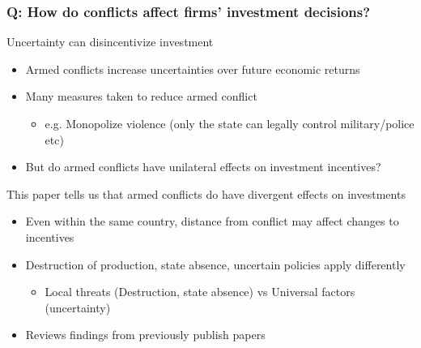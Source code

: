 \documentclass[aspectratio=169]{beamer}
\begin{document}
\begin{frame}
\frametitle{Q: How do conflicts affect firms' investment decisions?} 
Uncertainty can disincentivize investment
\begin{itemize}\setlength\itemsep{3pt}
\item Armed conflicts increase uncertainties over future economic returns
\item Many measures taken to reduce armed conflict
\begin{itemize}
\item e.g. Monopolize violence (only the state can legally control military/police etc)
\end{itemize}
\item But do armed conflicts have unilateral effects on investment incentives? 
\end{itemize}\medskip
This paper tells us that armed conflicts do have divergent effects on investments
\begin{itemize}\setlength\itemsep{3pt}
\item Even within the same country, distance from conflict may affect changes to incentives
\item Destruction of production, state absence, uncertain policies apply differently
\begin{itemize}
  \item Local threats (Destruction, state absence) vs Universal factors (uncertainty) 
\end{itemize}
\item Reviews findings from previously publish papers 
\end{itemize}\medskip
\end{frame}
\end{document}
